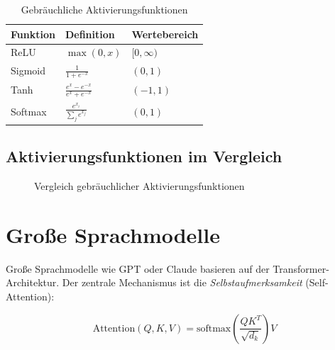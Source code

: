 \documentclass{bfarticle}
\begin{document}
\begin{table}[h]
\centering
\caption{Gebräuchliche Aktivierungsfunktionen}
\label{tab:aktivierung}
\begin{tabular}{lll}
\toprule
Funktion & Definition & Wertebereich \\
\midrule
ReLU     & $\max(0, x)$                        & $[0, \infty)$ \\
Sigmoid  & $\frac{1}{1+e^{-x}}$               & $(0, 1)$ \\
Tanh     & $\frac{e^x - e^{-x}}{e^x + e^{-x}}$ & $(-1, 1)$ \\
Softmax  & $\frac{e^{x_i}}{\sum_j e^{x_j}}$   & $(0, 1)$ \\
\bottomrule
\end{tabular}
\end{table}

\subsection{Aktivierungsfunktionen im Vergleich}

\begin{figure}[h]
\centering
{}
\caption{Vergleich gebräuchlicher Aktivierungsfunktionen}
\end{figure}

\section{Große Sprachmodelle}

Große Sprachmodelle wie GPT oder Claude basieren auf der
Transformer-Architektur. Der zentrale Mechanismus ist die
\emph{Selbstaufmerksamkeit} (Self-Attention):

\[
  \text{Attention}(Q, K, V) = \text{softmax}\!\left(
    \frac{QK^T}{\sqrt{d_k}}
  \right) V
\]
\end{document}
